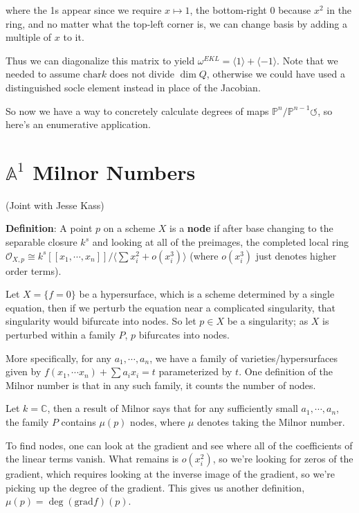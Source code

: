 \documentclass[11pt]{scrreprt}
\theoremstyle{definition}
\newcommand{\CC}[0]{{\mathbb{C}}}
\newcommand{\PP}[0]{{\mathbb{P}}}
\newcommand{\Af}[0]{{\mathbb{A}}}
\newcommand{\OO}[0]{{\mathcal{O}}}
\newcommand{\grad}[0]{\mathrm{grad}}
\newcommand{\generators}[1]{\langle{#1}\rangle}
\newcommand{\theset}[1]{\{{#1}\}}
\newcommand{\selfmap}[0]{{\circlearrowleft}}
\renewcommand{\char}[0]{\text{char}}
\begin{document}
where the 1s appear since we require \(x\mapsto 1\), the bottom-right 0
because \(x^2\) in the ring, and no matter what the top-left corner is,
we can change basis by adding a multiple of \(x\) to it.

Thus we can diagonalize this matrix to yield
\(\omega^{EKL} = \generators{1} + \generators{-1}\). Note that we needed
to assume \(\char k\) does not divide \(\dim Q\), otherwise we could
have used a distinguished socle element instead in place of the
Jacobian.

So now we have a way to concretely calculate degrees of maps
\(\PP^n /\PP^{n-1}\selfmap\), so here's an enumerative application.

\hypertarget{af1-milnor-numbers}{%
\section{\texorpdfstring{\(\Af^1\) Milnor
Numbers}{\textbackslash{}Af\^{}1 Milnor Numbers}}\label{af1-milnor-numbers}}

(Joint with Jesse Kass)

\textbf{Definition}: A point \(p\) on a scheme \(X\) is a \textbf{node}
if after base changing to the separable closure \(k^s\) and looking at
all of the preimages, the completed local ring
\(\OO_{X, p} \cong k^s[[x_1, \cdots, x_n]] / \generators{\sum x_i^2 + o(x_i^3)}\)
(where \(o(x_i^3)\) just denotes higher order terms).

Let \(X = \theset{f=0}\) be a hypersurface, which is a scheme determined
by a single equation, then if we perturb the equation near a complicated
singularity, that singularity would bifurcate into nodes. So let
\(p\in X\) be a singularity; as \(X\) is perturbed within a family
\(P\), \(p\) bifurcates into nodes.

More specifically, for any \(a_1, \cdots, a_n\), we have a family of
varieties/hypersurfaces given by
\(f(x_1, \cdots x_n) + \sum a_i x_i = t\) parameterized by \(t\). One
definition of the Milnor number is that in any such family, it counts
the number of nodes.

Let \(k=\CC\), then a result of Milnor says that for any sufficiently
small \(a_1, \cdots, a_n\), the family \(P\) contains \(\mu(p)\) nodes,
where \(\mu\) denotes taking the Milnor number.

To find nodes, one can look at the gradient and see where all of the
coefficients of the linear terms vanish. What remains is \(o(x_i^2)\),
so we're looking for zeros of the gradient, which requires looking at
the inverse image of the gradient, so we're picking up the degree of the
gradient. This gives us another definition,
\(\mu(p) = \deg(\grad f)(p)\).
\end{document}
